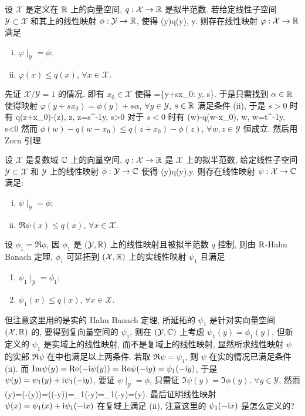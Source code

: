 设 $\mathcal X$ 是定义在 $\mathbb{R}$ 上的向量空间, $q: \mathcal{X}\to \mathbb{R}$ 是拟半范数. 
若给定线性子空间 $\mathcal{Y}\subset\mathcal{X}$ 和其上的线性映射 $\phi: \mathcal{Y}\to\mathbb{R}$, 使得
\bee
\phi(y)\le q(y), \forall y\in{}.
\eee
则存在线性映射 $\varphi: \mathcal{X}\to\mathbb{R}$ 满足
\begin{enumerate}[(i)]
 \item $\varphi\mid_{\mathcal{Y}}=\phi$;
 \item $\varphi(x)\le q(x)$, $\forall x\in\mathcal{X}$.
\end{enumerate}
\et
\ba
先证 $\mathcal{X}/\mathcal{Y}=1$ 的情况. 即有 $x_0\in \mathcal{X}$ 使得
\bee
{}=\{y+sx_0: y\in{}, s\in{}\}.
\eee
于是只需找到 $\alpha\in\mathbb{R}$ 使得映射 $\varphi(y+sx_0)=\phi(y)+s\alpha$, $\forall y\in\mathcal{Y}$, 
$s\in\mathbb{R}$ 满足条件 (ii), 于是 $s>0$ 时有
\bee
\alpha\le q(z+x_0)-\phi(z), \forall z\in{}, z=s^{-1}y, s>0
\eee
对于 $s<0$ 时有
\bee
\alpha\ge\phi(w)-q(w-x_0), \forall w\in{}, w=t^{-1}y, s<0
\eee
然而 $\phi(w)-q(w-x_0)\le q(z+x_0)-\phi(z)$, $\forall w,z\in\mathcal{Y}$ 恒成立.
然后用 Zorn 引理.
\ea

设 $\mathcal{X}$ 是复数域 $\mathbb{C}$ 上的向量空间, $q: \mathcal{X}\to\mathbb{R}$ 是 $\mathcal{X}$ 上的拟半范数, 
给定线性子空间 $\mathcal{Y}\subset\mathcal{X}$ 和 $\mathcal{Y}$ 上的线性映射 $\phi: \mathcal{Y}\to\mathbb{C}$ 使得
\bee
\Re\phi(y)\le q(y),\quad\forall y\in{}.
\eee
则存在线性映射 $\psi:\mathcal{X}\to\mathbb{C}$ 满足:
\begin{enumerate}[(i)]
 \item $\psi\mid_{\mathcal{Y}}=\phi$;
 \item $\Re\psi(x)\le q(x)$, $\forall x\in\mathcal{X}$.
\end{enumerate}
\eu
\ba
设 $\phi_1=\Re\phi$, 因 $\phi_1$ 是 $(\mathcal{Y},\mathbb{R})$ 上的线性映射且被拟半范数 $q$ 控制, 
则由 $\mathbb{R}$-Hahn Banach 定理, $\phi_1$ 可延拓到 $(\mathcal{X},\mathbb{R})$ 上的实线性映射 $\psi_1$ 且满足
\begin{enumerate}[(i')]
 \item $\psi_1\mid_{\mathcal{Y}}=\phi_1$;
 \item $\psi_1(x)\le q(x)$, $\forall x\in\mathcal{X}$.
\end{enumerate}
但注意这里用的是实的 Hahn Banach 定理, 所延拓的 $\psi_1$ 是针对实向量空间 $(\mathcal{X},\mathbb{R})$ 的, 要得到复向量空间的 $\psi_1$, 
则在 $(\mathcal{Y},\mathbb{C})$ 上考虑 $\psi_1(y)=\phi_1(y)$, 但新定义的 $\psi_1$ 是实域上的线性映射, 而不是复域上的线性映射, 
显然所求线性映射 $\psi$ 的实部 $\Re\psi$ 在{\color{red}{实线性空间}}中也满足以上两条件. 
若取 $\Re \psi=\psi_1$, 则 $\psi$ 在实的情况已满足条件 (ii). 而 $\mathrm{Im}\psi(y)=\mathrm{Re}(-\mathrm{i}\psi(y))=\mathrm{Re}\psi(-\mathrm{i} y)=\psi_1(-\mathrm{i} y)$, 于是 $\psi(y)=\psi_1(y)+\mathrm{i}\psi_1(-\mathrm{i} y)$, 
要证 $\psi\mid_{\mathcal{Y}}=\phi$, 只需证 $\Im\psi(y)=\Im\phi(y)$, $\forall y\in\mathcal{Y}$, 然而
\bee
\Im\phi(y)=\Re(-\ui\phi(y))=\Re(\phi(-\ui y))=\phi_1(-\ui y)=\psi_1(-\ui y)=\Im\psi(y).
\eee
最后证明线性映射 $\psi(x)=\psi_1(x)+\mathrm{i}\psi_1(-\mathrm{i} x)$ 在复域上满足 (ii), 注意这里的 $\psi_1(-\mathrm{i} x)$ 是怎么定义的?
\ea

